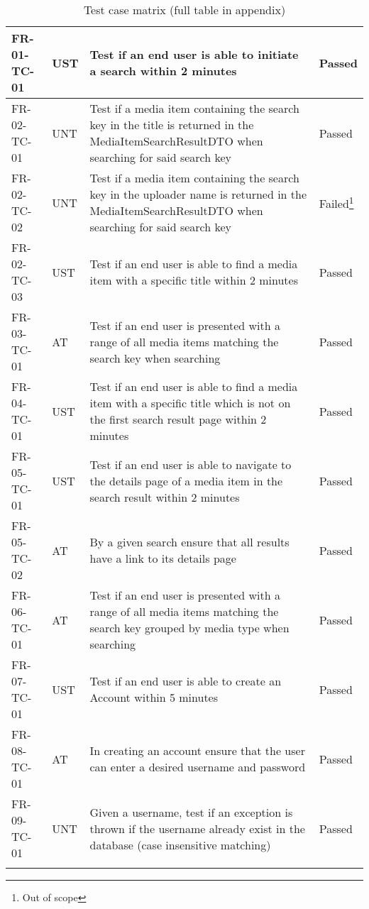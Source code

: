 \documentclass[../report.tex]{subfiles}
\begin{document}
\begin{longtable}{|L{2.1cm}|L{0.8cm}|L{9cm}|L{1.2cm}|}
FR-01-TC-01 & UST & Test if an end user is able to initiate a search within 2 minutes & Passed  \\ \hline
FR-02-TC-01& UNT& Test if a media item containing the search key in the title is returned in the MediaItemSearchResultDTO when searching for said search key& Passed  \\ \hline
FR-02-TC-02& UNT& Test if a media item containing the search key in the uploader name is returned in the MediaItemSearchResultDTO when searching for said search key& Failed\footnote{Out of scope}  \\ \hline
FR-02-TC-03&UST&Test if an end user is able to find a media item with a specific title within 2 minutes&Passed  \\ \hline
FR-03-TC-01&AT&Test if an end user is presented with a range of all media items matching the search key when searching &Passed  \\ \hline
FR-04-TC-01&UST&Test if an end user is able to find a media item with a specific title which is not on the first search result page within 2 minutes&Passed  \\ \hline
FR-05-TC-01&UST&Test if an end user is able to navigate to the details page of a media item in the search result within 2 minutes&Passed  \\ \hline
FR-05-TC-02&AT&By a given search ensure that all results have a link to its details page&Passed  \\ \hline
FR-06-TC-01&AT&Test if an end user is presented with a range of all media items matching the search key grouped by media type when searching &Passed  \\ \hline
FR-07-TC-01&UST&Test if an end user is able to create an Account within 5 minutes&Passed  \\ \hline
FR-08-TC-01&AT&In creating an account ensure that the user can enter a desired username and password&Passed  \\ \hline
FR-09-TC-01&UNT&Given a username, test if an exception is thrown if the username already exist in the database (case insensitive matching)&Passed  \\ \hline

\captionsetup{belowskip=10pt}

\caption{\label{testmatrix} Test case matrix (full table in appendix)}

\end{longtable}
\end{document}
